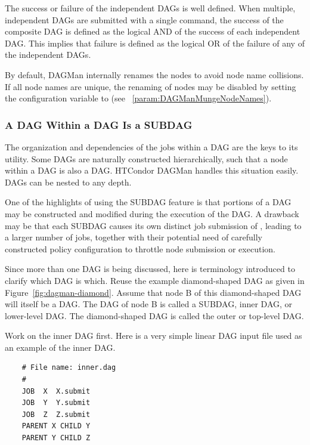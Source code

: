 The success or failure of the independent DAGs is well defined.
When multiple, independent DAGs are submitted with a single
command, the
success of the composite DAG is defined as the logical AND
of the success of each independent DAG.
This implies that failure is defined as the logical OR
of the failure of any of the independent DAGs.

By default, DAGMan internally renames the nodes to avoid node name collisions.  
If all node names are unique, 
the renaming of nodes may be disabled by
setting the configuration variable 
to  (see ~\ref{param:DAGManMungeNodeNames}).


\subsubsection{\label{sec:DAGsinDAGs}A DAG Within a DAG Is a SUBDAG}

The organization and dependencies of the jobs within a DAG
are the keys to its utility.
Some DAGs are naturally constructed hierarchically,
such that a node within a DAG is also a DAG.
HTCondor DAGMan handles this situation easily.
DAGs can be nested to any depth.

One of the highlights of using the SUBDAG feature is that portions of a DAG
may be constructed and modified during the execution of the DAG.
A drawback may be that each SUBDAG causes its own distinct job submission
of , leading to a larger number of jobs,
together with their potential need of carefully constructed policy configuration
to throttle node submission or execution.

Since more than one DAG is being discussed, 
here is terminology introduced to clarify which DAG is which. 
Reuse the example diamond-shaped DAG as given in 
Figure~\ref{fig:dagman-diamond}.
Assume that node B of this diamond-shaped DAG
will itself be a DAG.
The DAG of node B is called a SUBDAG, inner DAG, or lower-level DAG.
The diamond-shaped DAG is called the outer or top-level DAG.

Work on the inner DAG first.
Here is a very simple linear DAG input file used as
an example of the inner DAG.
\begin{verbatim}
    # File name: inner.dag
    #
    JOB  X  X.submit
    JOB  Y  Y.submit
    JOB  Z  Z.submit
    PARENT X CHILD Y
    PARENT Y CHILD Z
\end{verbatim}

